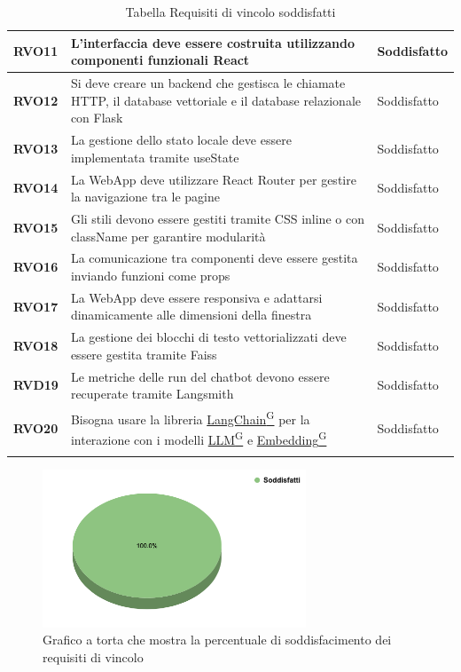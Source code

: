 \begin{longtable}{|>{\centering\arraybackslash}m{}|>{\centering\arraybackslash}m{}|>{\centering\arraybackslash}m{}|}
    \hline
    \textbf{RVO11} & L’interfaccia deve essere costruita utilizzando componenti funzionali React & Soddisfatto \\
    \hline
    \textbf{RVO12} & Si deve creare un backend che gestisca le chiamate HTTP, il database vettoriale e il database relazionale con Flask & Soddisfatto \\
    \hline
    \textbf{RVO13} & La gestione dello stato locale deve essere implementata tramite useState & Soddisfatto \\
    \hline
    \textbf{RVO14} & La WebApp deve utilizzare React Router per gestire la navigazione tra le pagine & Soddisfatto \\
    \hline
    \textbf{RVO15} & Gli stili devono essere gestiti tramite CSS inline o con className per garantire modularità & Soddisfatto \\
    \hline
    \textbf{RVO16} & La comunicazione tra componenti deve essere gestita inviando funzioni come props & Soddisfatto \\
    \hline
    \textbf{RVO17} & La WebApp deve essere responsiva e adattarsi dinamicamente alle dimensioni della finestra & Soddisfatto \\
    \hline
    \textbf{RVO18} & La gestione dei blocchi di testo vettorializzati deve essere gestita tramite Faiss & Soddisfatto \\
    \hline
    \textbf{RVD19} & Le metriche delle run del chatbot devono essere recuperate tramite Langsmith & Soddisfatto \\
    \hline
    \textbf{RVO20} & Bisogna usare la libreria \href{https://code7crusaders.github.io/docs/PB/documentazione_interna/glossario.html#langchain}{LangChain\textsuperscript{G}} per la interazione con i modelli \href{https://code7crusaders.github.io/docs/PB/documentazione_interna/glossario.html#llm-large-language-model}{LLM\textsuperscript{G}} e \href{https://code7crusaders.github.io/docs/PB/documentazione_interna/glossario.html#embedding}{Embedding\textsuperscript{G}} & Soddisfatto \\
    \hline
\caption{Tabella Requisiti di vincolo soddisfatti}
\end{longtable}

\begin{figure}[H]
    \centering
    \includegraphics[width=0.7\textwidth]{img/RequisitiVincolo.png}
    \caption{Grafico a torta che mostra la percentuale di soddisfacimento dei requisiti di vincolo}
\end{figure}

